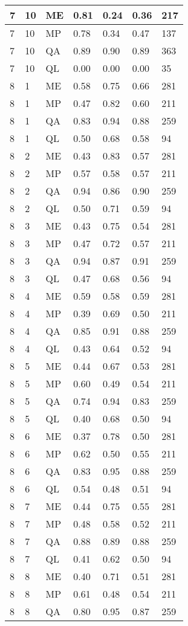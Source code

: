 \begin{table}[!ht]
\begin{tabularx}{300pt}{|X|X|X|X|X|X|X|}
\hline
7&10&ME&0.81&0.24&0.36&217\\
\hline
7&10&MP&0.78&0.34&0.47&137\\
\hline
7&10&QA&0.89&0.90&0.89&363\\
\hline
7&10&QL&0.00&0.00&0.00&35\\
\hline
8&1&ME&0.58&0.75&0.66&281\\
\hline
8&1&MP&0.47&0.82&0.60&211\\
\hline
8&1&QA&0.83&0.94&0.88&259\\
\hline
8&1&QL&0.50&0.68&0.58&94\\
\hline
8&2&ME&0.43&0.83&0.57&281\\
\hline
8&2&MP&0.57&0.58&0.57&211\\
\hline
8&2&QA&0.94&0.86&0.90&259\\
\hline
8&2&QL&0.50&0.71&0.59&94\\
\hline
8&3&ME&0.43&0.75&0.54&281\\
\hline
8&3&MP&0.47&0.72&0.57&211\\
\hline
8&3&QA&0.94&0.87&0.91&259\\
\hline
8&3&QL&0.47&0.68&0.56&94\\
\hline
8&4&ME&0.59&0.58&0.59&281\\
\hline
8&4&MP&0.39&0.69&0.50&211\\
\hline
8&4&QA&0.85&0.91&0.88&259\\
\hline
8&4&QL&0.43&0.64&0.52&94\\
\hline
8&5&ME&0.44&0.67&0.53&281\\
\hline
8&5&MP&0.60&0.49&0.54&211\\
\hline
8&5&QA&0.74&0.94&0.83&259\\
\hline
8&5&QL&0.40&0.68&0.50&94\\
\hline
8&6&ME&0.37&0.78&0.50&281\\
\hline
8&6&MP&0.62&0.50&0.55&211\\
\hline
8&6&QA&0.83&0.95&0.88&259\\
\hline
8&6&QL&0.54&0.48&0.51&94\\
\hline
8&7&ME&0.44&0.75&0.55&281\\
\hline
8&7&MP&0.48&0.58&0.52&211\\
\hline
8&7&QA&0.88&0.89&0.88&259\\
\hline
8&7&QL&0.41&0.62&0.50&94\\
\hline
8&8&ME&0.40&0.71&0.51&281\\
\hline
8&8&MP&0.61&0.48&0.54&211\\
\hline
8&8&QA&0.80&0.95&0.87&259\\

\end{tabularx}
\end{table}
